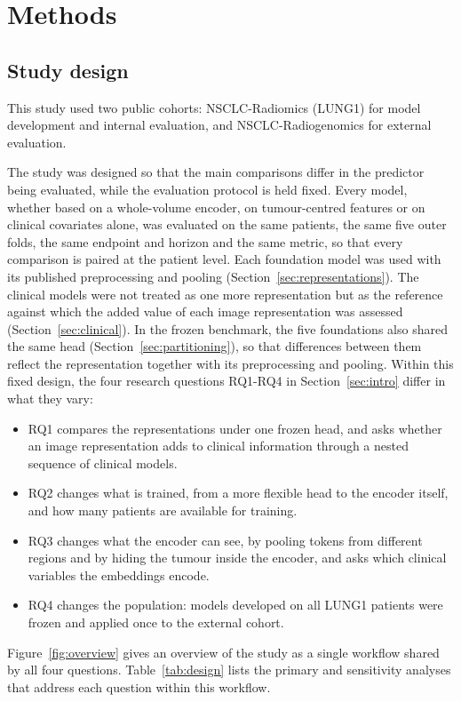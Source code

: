\section{Methods}\label{sec:methods}

\subsection{Study design}\label{sec:design}
This study used two public cohorts: NSCLC-Radiomics (LUNG1) for model development and internal evaluation, and NSCLC-Radiogenomics for external evaluation.\cite{tciaLung1,tciaRadiogenomics,bakr2018}

The study was designed so that the main comparisons differ in the predictor being evaluated, while the evaluation protocol is held fixed. Every model, whether based on a whole-volume encoder, on tumour-centred features or on clinical covariates alone, was evaluated on the same patients, the same five outer folds, the same endpoint and horizon and the same metric, so that every comparison is paired at the patient level. Each foundation model was used with its published preprocessing and pooling (Section~\ref{sec:representations}). The clinical models were not treated as one more representation but as the reference against which the added value of each image representation was assessed (Section~\ref{sec:clinical}). In the frozen benchmark, the five foundations also shared the same head (Section~\ref{sec:partitioning}), so that differences between them reflect the representation together with its preprocessing and pooling. Within this fixed design, the four research questions RQ1-RQ4 in Section~\ref{sec:intro} differ in what they vary:
\begin{itemize}
\item RQ1 compares the representations under one frozen head, and asks whether an image representation adds to clinical information through a nested sequence of clinical models.
\item RQ2 changes what is trained, from a more flexible head to the encoder itself, and how many patients are available for training.
\item RQ3 changes what the encoder can see, by pooling tokens from different regions and by hiding the tumour inside the encoder, and asks which clinical variables the embeddings encode.
\item RQ4 changes the population: models developed on all LUNG1 patients were frozen and applied once to the external cohort.
\end{itemize}
Figure~\ref{fig:overview} gives an overview of the study as a single workflow shared by all four questions. Table~\ref{tab:design} lists the primary and sensitivity analyses that address each question within this workflow.

